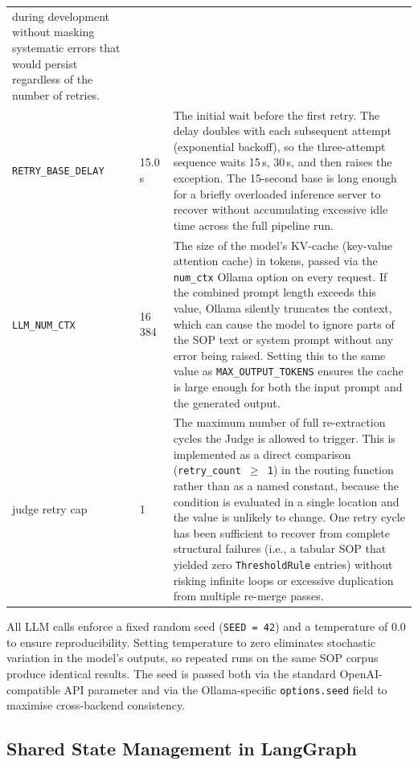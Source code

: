 ﻿\documentclass[11pt]{article}
\begin{document}
\begin{table}[htbp]
\begin{tabular}{@{} l p{4.0cm} p{7.5cm} @{}}
    during development without masking systematic errors that would persist
    regardless of the number of retries. \\
\texttt{RETRY\_BASE\_DELAY}
  & 15.0\,s
  & The initial wait before the first retry.  The delay doubles with each
    subsequent attempt (exponential backoff), so the three-attempt sequence waits
    15\,s, 30\,s, and then raises the exception.  The 15-second base is long enough
    for a briefly overloaded inference server to recover without accumulating
    excessive idle time across the full pipeline run. \\
\texttt{LLM\_NUM\_CTX}
  & 16\,384
  & The size of the model's KV-cache (key-value attention cache) in tokens, passed
    via the \texttt{num\_ctx} Ollama option on every request.  If the combined
    prompt length exceeds this value, Ollama silently truncates the context, which
    can cause the model to ignore parts of the SOP text or system prompt without
    any error being raised.  Setting this to the same value as
    \texttt{MAX\_OUTPUT\_TOKENS} ensures the cache is large enough for both the
    input prompt and the generated output. \\
judge retry cap
  & 1
  & The maximum number of full re-extraction cycles the Judge is allowed to
    trigger.  This is implemented as a direct comparison
    (\texttt{retry\_count~$\geq$~1}) in the routing function rather than as a
    named constant, because the condition is evaluated in a single location and
    the value is unlikely to change.  One retry cycle has been sufficient to
    recover from complete structural failures (i.e., a tabular SOP that yielded
    zero \texttt{ThresholdRule} entries) without risking infinite loops or
    excessive duplication from multiple re-merge passes. \\
\bottomrule
\end{tabular}
\end{table}

All LLM calls enforce a fixed random seed (\texttt{SEED~=~42}) and a temperature
of $0.0$ to ensure reproducibility. Setting temperature to zero eliminates
stochastic variation in the model's outputs, so repeated runs on the same SOP
corpus produce identical results. The seed is passed both via the standard
OpenAI-compatible API parameter and via the Ollama-specific \texttt{options.seed}
field to maximise cross-backend consistency.

\subsection{Shared State Management in LangGraph}
\label{sec:langgraph_state}
\end{document}
